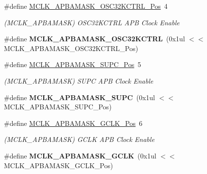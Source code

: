 \begin{DoxyCompactItemize}
\item 
\hypertarget{group___s_a_m_l21___m_c_l_k_gac13c0587fd456465accd0efc6e769413}{}\#define \hyperlink{group___s_a_m_l21___m_c_l_k_gac13c0587fd456465accd0efc6e769413}{M\+C\+L\+K\+\_\+\+A\+P\+B\+A\+M\+A\+S\+K\+\_\+\+O\+S\+C32\+K\+C\+T\+R\+L\+\_\+\+Pos}~4\label{group___s_a_m_l21___m_c_l_k_gac13c0587fd456465accd0efc6e769413}

\begin{DoxyCompactList}\small\item\em (M\+C\+L\+K\+\_\+\+A\+P\+B\+A\+M\+A\+S\+K) O\+S\+C32\+K\+C\+T\+R\+L A\+P\+B Clock Enable \end{DoxyCompactList}\item 
\hypertarget{group___s_a_m_l21___m_c_l_k_gab35f8bfe9dfac960c39e117b13c0c775}{}\#define {\bfseries M\+C\+L\+K\+\_\+\+A\+P\+B\+A\+M\+A\+S\+K\+\_\+\+O\+S\+C32\+K\+C\+T\+R\+L}~(0x1ul $<$$<$ M\+C\+L\+K\+\_\+\+A\+P\+B\+A\+M\+A\+S\+K\+\_\+\+O\+S\+C32\+K\+C\+T\+R\+L\+\_\+\+Pos)\label{group___s_a_m_l21___m_c_l_k_gab35f8bfe9dfac960c39e117b13c0c775}

\item 
\hypertarget{group___s_a_m_l21___m_c_l_k_ga9482e51359fc581f7c605977eb3685c5}{}\#define \hyperlink{group___s_a_m_l21___m_c_l_k_ga9482e51359fc581f7c605977eb3685c5}{M\+C\+L\+K\+\_\+\+A\+P\+B\+A\+M\+A\+S\+K\+\_\+\+S\+U\+P\+C\+\_\+\+Pos}~5\label{group___s_a_m_l21___m_c_l_k_ga9482e51359fc581f7c605977eb3685c5}

\begin{DoxyCompactList}\small\item\em (M\+C\+L\+K\+\_\+\+A\+P\+B\+A\+M\+A\+S\+K) S\+U\+P\+C A\+P\+B Clock Enable \end{DoxyCompactList}\item 
\hypertarget{group___s_a_m_l21___m_c_l_k_gaa034a3017bc25f04ecd48ed91b75c101}{}\#define {\bfseries M\+C\+L\+K\+\_\+\+A\+P\+B\+A\+M\+A\+S\+K\+\_\+\+S\+U\+P\+C}~(0x1ul $<$$<$ M\+C\+L\+K\+\_\+\+A\+P\+B\+A\+M\+A\+S\+K\+\_\+\+S\+U\+P\+C\+\_\+\+Pos)\label{group___s_a_m_l21___m_c_l_k_gaa034a3017bc25f04ecd48ed91b75c101}

\item 
\hypertarget{group___s_a_m_l21___m_c_l_k_ga5fb09fb3c0885c6bf234d8021344b40b}{}\#define \hyperlink{group___s_a_m_l21___m_c_l_k_ga5fb09fb3c0885c6bf234d8021344b40b}{M\+C\+L\+K\+\_\+\+A\+P\+B\+A\+M\+A\+S\+K\+\_\+\+G\+C\+L\+K\+\_\+\+Pos}~6\label{group___s_a_m_l21___m_c_l_k_ga5fb09fb3c0885c6bf234d8021344b40b}

\begin{DoxyCompactList}\small\item\em (M\+C\+L\+K\+\_\+\+A\+P\+B\+A\+M\+A\+S\+K) G\+C\+L\+K A\+P\+B Clock Enable \end{DoxyCompactList}\item 
\hypertarget{group___s_a_m_l21___m_c_l_k_ga71a56d5e1f337ebd9fdc1c2e7dd9c033}{}\#define {\bfseries M\+C\+L\+K\+\_\+\+A\+P\+B\+A\+M\+A\+S\+K\+\_\+\+G\+C\+L\+K}~(0x1ul $<$$<$ M\+C\+L\+K\+\_\+\+A\+P\+B\+A\+M\+A\+S\+K\+\_\+\+G\+C\+L\+K\+\_\+\+Pos)\label{group___s_a_m_l21___m_c_l_k_ga71a56d5e1f337ebd9fdc1c2e7dd9c033}


\end{DoxyCompactItemize}
